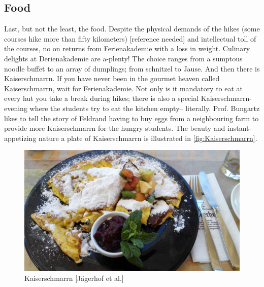 \subsection{Food}
Last, but not the least, the food. Despite the physical demands of the hikes (some courses hike more than fifty kilometers) [reference needed] and intellectual toll of the courses, no on returns from Ferienakademie with a loss in weight. Culinary delights at Derienakademie are a-plenty! The choice ranges from a sumptous noodle buffet to an array of dumplings; from schnitzel to Jause. And then there is Kaiserschmarrn. If you have never been in the gourmet heaven called Kaiserschmarrn, wait for Ferienakademie. Not only is it mandatory to eat at every hut you take a break during hikes; there is also a special Kaiserschmarrn-evening where the students try to eat the kitchen empty-- literally. Prof. Bungartz likes to tell the story of Feldrand having to buy eggs from a neighbouring farm to provide more Kaiserschmarrn for the hungry students. The beauty and instant-appetizing nature a plate of Kaiserschmarrn is illustrated in \autoref{fig:Kaiserschmarrn}.
\begin{figure}[ht]%
 	\begin{center}%
 		\includegraphics[scale=0.05]{img/Kaiserschmarrn.jpg}%
 		\caption{Kaiserschmarrn [Jägerhof et al.]}\label{fig:Kaiserschmarrn}%
 	\end{center}%
\end{figure}

